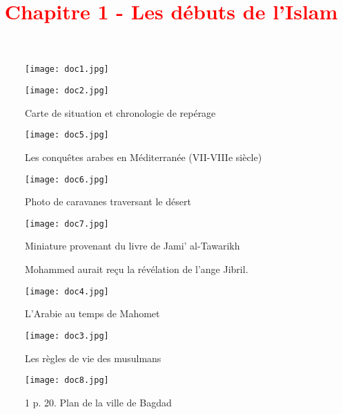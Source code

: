 \documentclass{beamer}
\date{}
\title{{\textcolor{red}{Chapitre 1 - Les débuts de l'Islam}}}
\begin{document}
\newcommand{\df}[2]{\textcolor{red}{\underline{#1}: #2}}

\newcommand{\doc}[1]{
\begin{flushright}
\fbox{Documents : #1}
\end{flushright}
}

\newcommand{\con}[1]{\textcolor{blue}{\underline{Consigne}: #1}}

\newcommand{\perso}[2]{\textcolor{green}{\underline{#1}: #2}}

\begin{frame}
\begin{figure}
\caption{Carte de situation et chronologie de repérage}
\texttt{[image: doc1.jpg]}


\texttt{[image: doc2.jpg]}
\end{figure}
\end{frame}

\begin{frame}
\begin{figure}
\caption{Les conquêtes arabes en Méditerranée (VII-VIIIe siècle)}
\texttt{[image: doc5.jpg]}
\end{figure}
\end{frame}

\begin{frame}
\begin{figure}
\caption{Photo de caravanes traversant le désert}
\texttt{[image: doc6.jpg]}
\end{figure}
\end{frame}

\begin{frame}
\begin{figure}
\caption{Mohammed aurait reçu la révélation de l'ange Jibril.}
\texttt{[image: doc7.jpg]}

Miniature provenant du livre de Jami' al-Tawarikh
\end{figure}
\end{frame}

\begin{frame}
\begin{figure}
\caption{L'Arabie au temps de Mahomet}
\texttt{[image: doc4.jpg]}
\end{figure}
\end{frame}

\begin{frame}
\begin{figure}
\caption{Les règles de vie des musulmans}
\texttt{[image: doc3.jpg]}
\end{figure}
\end{frame}

\begin{frame}
\begin{figure}
\caption{1 p. 20. Plan de la ville de Bagdad}
\texttt{[image: doc8.jpg]}
\end{figure}
\end{frame}

  
\end{document}
